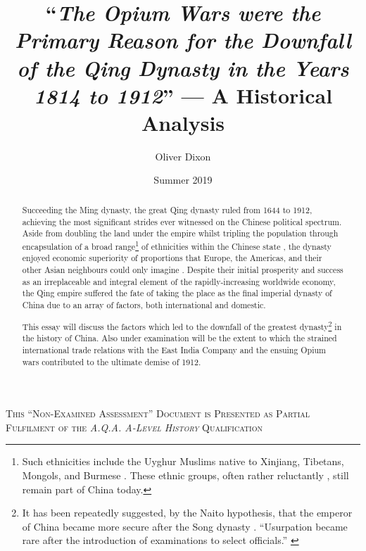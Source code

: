 \documentclass{article}
\title{``\emph{The Opium Wars were the Primary Reason for the Downfall of the Qing Dynasty in the Years 1814 to 1912}'' --- A Historical Analysis}
\author{Oliver Dixon}
\date{Summer 2019}
\newcommand{\textrule}{\noindent\makebox[\linewidth]{\rule{\linewidth}{0.4pt}}}
\begin{document}
\clearpage\maketitle
\thispagestyle{titlehdr}
\pagestyle{stdhdr}

\vspace*{-1.5em}
\begin{figure}[h!]
	\centering
        \def\svgwidth{0.5\linewidth}
	
\end{figure}
\vspace*{-0.5em}

\begin{abstract}

	Succeeding the Ming dynasty, the great Qing dynasty ruled from 1644 to 1912, achieving the most significant strides ever witnessed on the Chinese political spectrum. Aside from doubling the land under the empire \autocites{Turchin:2006}{Goldstone:1995} whilst tripling the population through encapsulation of a broad range\footnote{Such ethnicities include the Uyghur Muslims native to Xinjiang, Tibetans, Mongols, and Burmese \autocite{Chia:1993}. These ethnic groups, often rather reluctantly \autocites{Teichman:2002}{Smith:2009}{Dwyer:2005}, still remain part of China today.} of ethnicities within the Chinese state \autocite{Rowe:2012}, the dynasty enjoyed economic superiority of proportions that Europe, the Americas, and their other Asian neighbours could only imagine \autocite{Maddison:2007}. Despite their initial prosperity and success as an irreplaceable and integral element of the rapidly-increasing worldwide economy, the Qing empire suffered the fate of taking the place as the final imperial dynasty of China due to an array of factors, both international and domestic.

        This essay will discuss the factors which led to the downfall of the greatest dynasty\footnote{It has been repeatedly suggested, by the Naito hypothesis, that the emperor of China became more secure after the Song dynasty \autocite{Miyakawa:1955}. ``Usurpation became rare after the introduction of examinations to select officials.'' \autocite{Sng:2014}} in the history of China. Also under examination will be the extent to which the strained international trade relations with the East India Company and the ensuing Opium wars contributed to the ultimate demise of 1912.

\end{abstract}

\textrule%
\vspace*{0.6em}
{\centering \textsc{This ``Non-Examined Assessment'' Document is Presented as Partial Fulfilment of the \textit{A.Q.A. A-Level History} Qualification}\\}
\textrule%
\end{document}
